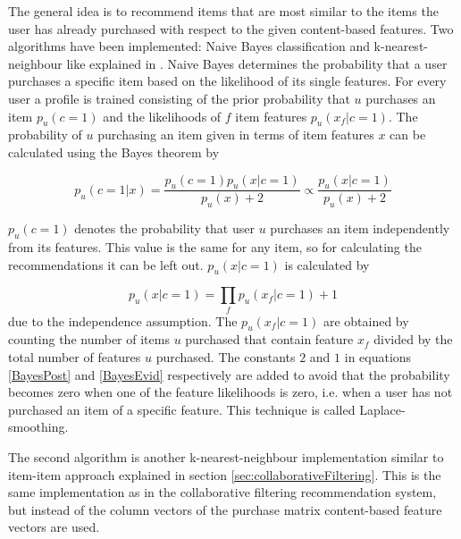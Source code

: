 \documentclass[10pt]{reportMaster}
\begin{document}
The general idea is to recommend items that are most similar to the items the user has already purchased with respect to the given content-based features.
Two algorithms have been implemented: Naive Bayes classification and k-nearest-neighbour like explained in \cite{contentbasedPazzani}.
Naive Bayes determines the probability that a user purchases a specific item based on the likelihood of its single features.
For every user a profile is trained consisting of the prior probability that $u$ purchases an item $p_u(c=1)$ and  the likelihoods of $f$ item features $p_u(x_f|c=1)$.
The probability of $u$ purchasing an item given in terms of item features $x$ can be calculated using the Bayes theorem by 

\begin{equation}
\label{BayesPost}
	p_u(c=1|x) = \frac{p_u(c=1) p_u(x|c=1)}{p_u(x)+2} \propto \frac{p_u(x|c=1)}{p_u(x)+2}
\end{equation}

$p_u(c=1)$ denotes the probability that user $u$ purchases an item independently from its features.
This value is the same for any item, so for calculating the recommendations it can be left out.
$p_u(x|c=1)$ is calculated by 

\begin{equation}
\label{BayesEvid}
p_u(x|c=1) = \prod_f{p_u(x_f|c=1)+1}
\end{equation}
due to the independence assumption.
The $p_u(x_f|c=1)$ are obtained by counting the number of items $u$ purchased that contain feature $x_f$ divided by the total number of features $u$ purchased.
The constants $2$ and $1$ in equations \ref{BayesPost} and \ref{BayesEvid} respectively are added to avoid that the probability becomes zero when one of the feature likelihoods is zero, i.e. when a user has not purchased an item of a specific feature.
This technique is called Laplace-smoothing.

The second algorithm is another k-nearest-neighbour implementation similar to item-item approach explained in section \ref{sec:collaborativeFiltering}.
This is the same implementation as in the collaborative filtering recommendation system, but instead of the column vectors of the purchase matrix content-based feature vectors are used.

\end{document}
